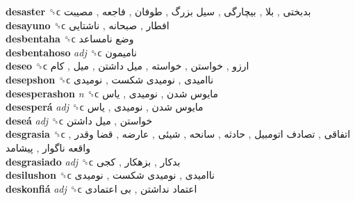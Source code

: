 \textbf{desaster} ␝ϲ   بدبختی ,  بلا ,  بیچارگی ,  سیل بزرگ ,  طوفان ,  فاجعه ,  مصیبت   \\
\textbf{desayuno} ␝ϲ   افطار ,  صبحانه ,  ناشتایی   \\
\textbf{desbentaha} ␝ϲ   وضع نامساعد   \\
\textbf{desbentahoso} \emph{adj}  ␝ϲ   نامیمون   \\
\textbf{deseo} ␝ϲ   ارزو ,  خواستن ,  خواسته ,  میل داشتن ,  میل ,  کام   \\
\textbf{desepshon} ␝ϲ   ناامیدی ,  نومیدی شکست ,  نومیدی   \\
\textbf{desesperashon} \emph{n}  ␝ϲ   مایوس شدن ,  نومیدی ,  یاس   \\
\textbf{desesperá} \emph{adj}  ␝ϲ   مایوس شدن ,  نومیدی ,  یاس   \\
\textbf{deseá} \emph{adj}  ␝ϲ   خواستن ,  میل داشتن   \\
\textbf{desgrasia} ␝ϲ   اتفاقی ,  تصادف اتومبیل ,  حادثه ,  سانحه ,  شیئی ,  عارضه ,  قضا وقدر ,  واقعه ناگوار ,  پیشامد   \\
\textbf{desgrasiado} \emph{adj}  ␝ϲ   بدکار ,  بزهکار ,  کجی   \\
\textbf{desilushon} ␝ϲ   ناامیدی ,  نومیدی شکست ,  نومیدی   \\
\textbf{deskonfiá} \emph{adj}  ␝ϲ   اعتماد نداشتن ,  بی اعتمادی   \\
